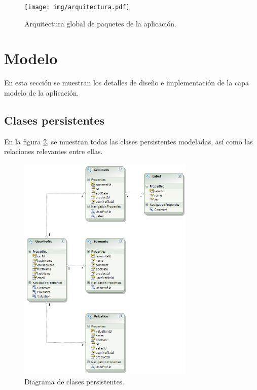 \documentclass{article}
\begin{document}
\begin{figure}[h]
  \centering
    \texttt{[image: img/arquitectura.pdf]}
  \caption{Arquitectura global de paquetes de la aplicación.}
  \label{fig:ArquitecturaGlobal}
\end{figure}	

\section{Modelo}

	En esta sección se muestran los detalles de diseño e implementación de la capa modelo de la aplicación.

\subsection{Clases persistentes} \label{cap:ClasesPersistentes}

	En la figura \ref{fig:ClasesPersistentes}, se muestran todas las clases persistentes modeladas, así como las relaciones relevantes entre ellas.
	
\begin{figure}[h]
  \centering
    \includegraphics[width=0.75\textwidth]{img/EntityDesignerDiagram.png}
  \caption{Diagrama de clases persistentes.}
  \label{fig:ClasesPersistentes}
\end{figure}	
	
\end{document}
